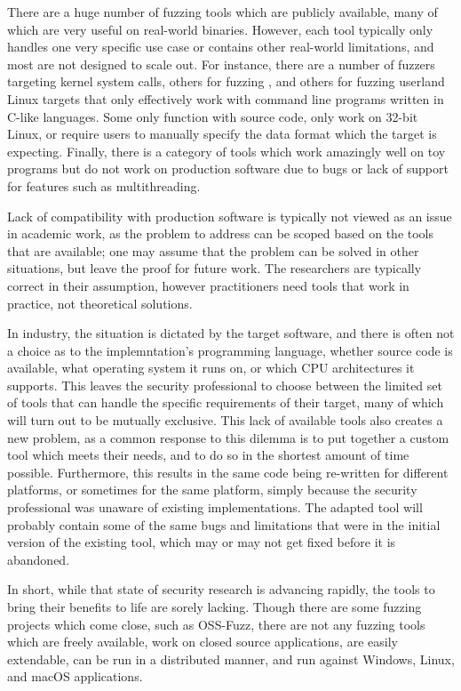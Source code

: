 There are a huge number of fuzzing tools\cite{afl,aflosx,winafl,peach22,syzkaller,ossfuzz,driller,radamsa,ni,zzuf,synfuzz,brundlefuzz,honggfuzz,kafl,vuzzer,boofuzz} which are publicly available, many of
which are very useful on real-world binaries.
However, each tool
typically only handles one very specific use case or contains other real-world limitations, and most are not designed to scale
out.  For instance, there are a number of fuzzers targeting kernel system calls\cite{syzkaller,trinity,kafl,osxfuzz}, others for
fuzzing \IOCTLs{}\cite{ioctlfuzzer,ioctlbf}, and others for fuzzing userland Linux targets that only effectively work with
command line programs written in C-like languages\cite{afl}.  Some only function with
source code, only work on 32-bit Linux\cite{vuzzer}, or require users to manually specify
the data format which the target is
expecting.\cite{peach,boofuzz}  Finally, there is a category of tools which work amazingly well
on toy programs but do not work on production software due to bugs or lack of
support for features such as multithreading.\cite{grimmdriller,angrissues}

Lack of compatibility with production software is typically not viewed as an issue in academic work, as the problem to address can be
scoped based on the tools that are available; one may assume that the problem can
be solved in other situations, but leave the proof for future work.  The researchers
are typically correct in their assumption, however practitioners need tools
that work in practice, not theoretical solutions.

In industry, the situation is dictated by the target software,
and there is often not a choice as to the implemntation's programming language,
whether source code is available, what operating system it runs
on, or which CPU architectures it supports. This leaves the security
professional to choose between the limited set of tools that can handle the specific requirements of their target, many of which will
turn out to be mutually exclusive. This lack of available tools also creates a new problem, as a common
response to this dilemma is to put together a custom tool which meets their
needs, and to do so in the shortest amount of time possible.  Furthermore,
this results in the same code being re-written for different platforms, or
sometimes for the same platform, simply because the security professional was
unaware of existing implementations.  The adapted tool will probably
contain some of the same bugs and limitations that were in the initial
version of the existing tool, which may or may not get fixed before it is
abandoned.

In short, while that state of security research is advancing rapidly, the
tools to bring their benefits to life are sorely lacking.  Though there are some
fuzzing projects which come close, such as OSS-Fuzz,\cite{ossfuzz} there
are not any fuzzing tools which are freely available, work on closed source applications,
are easily extendable,
can be run in a distributed manner, and run against Windows, Linux, and macOS applications.

